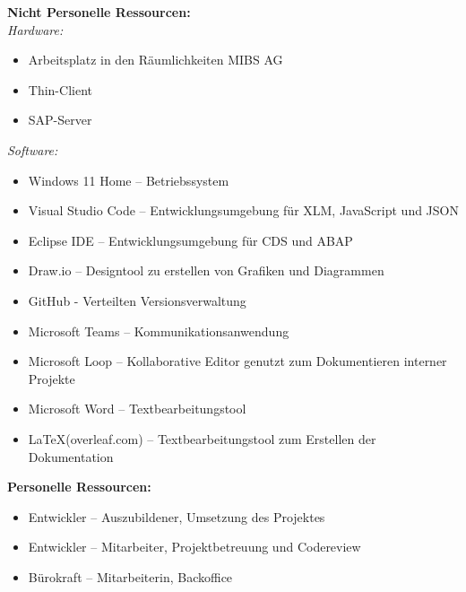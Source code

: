 \textbf{Nicht Personelle Ressourcen:} \\
\textit{Hardware:}
\begin{itemize}
    \item Arbeitsplatz in den Räumlichkeiten MIBS AG
    \item Thin-Client
    \item SAP-Server
\end{itemize}
\textit{Software:}
\begin{itemize}
    \item Windows 11 Home – Betriebssystem
    \item Visual Studio Code – Entwicklungsumgebung für XLM, JavaScript und JSON
    \item Eclipse IDE – Entwicklungsumgebung für CDS und ABAP
    \item Draw.io – Designtool zu erstellen von Grafiken und Diagrammen
    \item GitHub - Verteilten Versionsverwaltung
    \item Microsoft Teams – Kommunikationsanwendung
    \item Microsoft Loop – Kollaborative Editor genutzt zum Dokumentieren interner Projekte
    \item Microsoft Word – Textbearbeitungstool
    \item \LaTeX  (overleaf.com) – Textbearbeitungstool zum Erstellen der Dokumentation
\end{itemize}
\textbf{Personelle Ressourcen:}
\begin{itemize}
    \item Entwickler – Auszubildener, Umsetzung des Projektes
    \item Entwickler – Mitarbeiter, Projektbetreuung und Codereview
    \item Bürokraft – Mitarbeiterin, Backoffice
\end{itemize}
